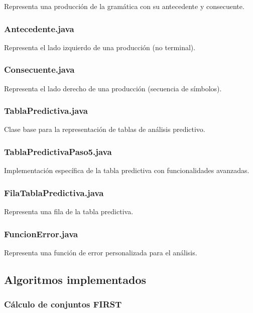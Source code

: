 Representa una producción de la gramática con su antecedente y consecuente.

\subsubsection{Antecedente.java}

Representa el lado izquierdo de una producción (no terminal).

\subsubsection{Consecuente.java}

Representa el lado derecho de una producción (secuencia de símbolos).

\subsubsection{TablaPredictiva.java}

Clase base para la representación de tablas de análisis predictivo.

\subsubsection{TablaPredictivaPaso5.java}

Implementación específica de la tabla predictiva con funcionalidades avanzadas.

\subsubsection{FilaTablaPredictiva.java}

Representa una fila de la tabla predictiva.

\subsubsection{FuncionError.java}

Representa una función de error personalizada para el análisis.

\subsection{Algoritmos implementados}

\subsubsection{Cálculo de conjuntos FIRST}


